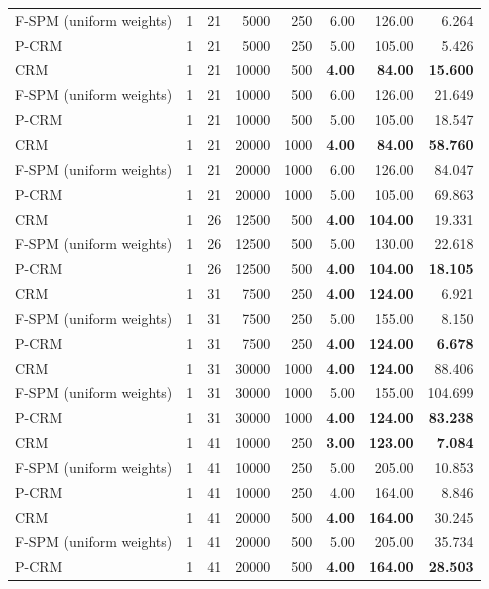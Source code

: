 \begin{tabular}{lrrrrrrr}
F-SPM (uniform weights) & 1 & 21 & 5000 & 250 & 6.00 & 126.00 & 6.264 \\
P-CRM & 1 & 21 & 5000 & 250 & 5.00 & 105.00 & 5.426 \\
\midrule
CRM & 1 & 21 & 10000 & 500 & \textbf{4.00} & \textbf{84.00} & \textbf{15.600} \\
F-SPM (uniform weights) & 1 & 21 & 10000 & 500 & 6.00 & 126.00 & 21.649 \\
P-CRM & 1 & 21 & 10000 & 500 & 5.00 & 105.00 & 18.547 \\
\midrule
CRM & 1 & 21 & 20000 & 1000 & \textbf{4.00} & \textbf{84.00} & \textbf{58.760} \\
F-SPM (uniform weights) & 1 & 21 & 20000 & 1000 & 6.00 & 126.00 & 84.047 \\
P-CRM & 1 & 21 & 20000 & 1000 & 5.00 & 105.00 & 69.863 \\
\midrule
CRM & 1 & 26 & 12500 & 500 & \textbf{4.00} & \textbf{104.00} & 19.331 \\
F-SPM (uniform weights) & 1 & 26 & 12500 & 500 & 5.00 & 130.00 & 22.618 \\
P-CRM & 1 & 26 & 12500 & 500 & \textbf{4.00} & \textbf{104.00} & \textbf{18.105} \\
\midrule
CRM & 1 & 31 & 7500 & 250 & \textbf{4.00} & \textbf{124.00} & 6.921 \\
F-SPM (uniform weights) & 1 & 31 & 7500 & 250 & 5.00 & 155.00 & 8.150 \\
P-CRM & 1 & 31 & 7500 & 250 & \textbf{4.00} & \textbf{124.00} & \textbf{6.678} \\
\midrule
CRM & 1 & 31 & 30000 & 1000 & \textbf{4.00} & \textbf{124.00} & 88.406 \\
F-SPM (uniform weights) & 1 & 31 & 30000 & 1000 & 5.00 & 155.00 & 104.699 \\
P-CRM & 1 & 31 & 30000 & 1000 & \textbf{4.00} & \textbf{124.00} & \textbf{83.238} \\
\midrule
CRM & 1 & 41 & 10000 & 250 & \textbf{3.00} & \textbf{123.00} & \textbf{7.084} \\
F-SPM (uniform weights) & 1 & 41 & 10000 & 250 & 5.00 & 205.00 & 10.853 \\
P-CRM & 1 & 41 & 10000 & 250 & 4.00 & 164.00 & 8.846 \\
\midrule
CRM & 1 & 41 & 20000 & 500 & \textbf{4.00} & \textbf{164.00} & 30.245 \\
F-SPM (uniform weights) & 1 & 41 & 20000 & 500 & 5.00 & 205.00 & 35.734 \\
P-CRM & 1 & 41 & 20000 & 500 & \textbf{4.00} & \textbf{164.00} & \textbf{28.503} \\

\end{tabular}
